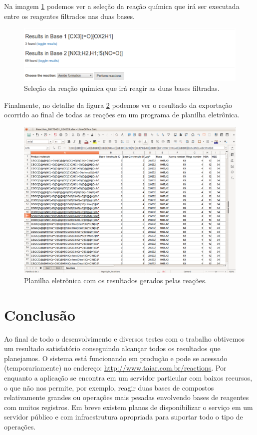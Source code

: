 \documentclass{abnt}
\begin{document}
Na imagem \ref{fig:react4} podemos ver a seleção da reação química que irá ser executada
entre os reagentes filtrados nas duas bases.

\begin{figure}[!htb]
  \centering
  \includegraphics[scale=0.5]{reaction4}
  \caption{Seleção da reação química que irá reagir as duas bases filtradas.}
  \label{fig:react4}
\end{figure}

Finalmente, no detalhe da figura \ref{fig:react5} podemos ver o resultado da exportação
ocorrido ao final de todas as reações em um programa de planilha eletrônica.

\begin{figure}[!htb]
  \centering
  \includegraphics[scale=0.4]{reaction5}
  \caption{Planilha eletrônica com os resultados gerados pelas reações.}
  \label{fig:react5}
\end{figure}

\chapter{Conclusão}

Ao final de todo o desenvolvimento e diversos testes com o trabalho obtivemos um
resultado satisfatório conseguindo alcançar todos os resultados que planejamos.
O sistema está funcionando em produção e pode se acessado (temporariamente) no
endereço: \url{http://www.taiar.com.br/reactions}. Por enquanto a aplicação se encontra
em um servidor particular com baixos recursos, o que não nos permite, por exemplo,
reagir duas bases de compostos relativamente grandes ou operações mais pesadas envolvendo
bases de reagentes com muitos registros. Em breve existem planos de disponibilizar
o serviço em um servidor público e com infraestrutura apropriada para suportar todo
o tipo de operações.
\end{document}
